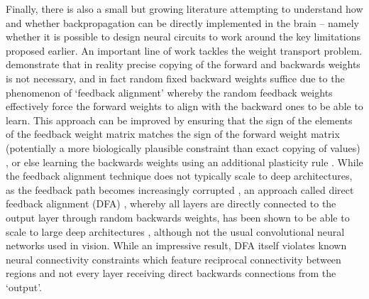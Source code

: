 Finally, there is also a small but growing literature attempting to understand how and whether backpropagation can be directly implemented in the brain -- namely whether it is possible to design neural circuits to work around the key limitations proposed earlier. An important line of work tackles the weight transport problem. \citet{lillicrap2016random} demonstrate that in reality precise copying of the forward and backwards weights is not necessary, and in fact random fixed backward weights suffice due to the phenomenon of `feedback alignment' whereby the random feedback weights effectively force the forward weights to align with the backward ones to be able to learn. This approach can be improved by ensuring that the sign of the elements of the feedback weight matrix matches the sign of the forward weight matrix (potentially a more biologically plausible constraint than exact copying of values) \citep{liao2016important}, or else learning the backwards weights using an additional plasticity rule \citep{amit2019deep,akrout2019deep,millidge2020relaxing}. While the feedback alignment technique does not typically scale to deep architectures, as the feedback path becomes increasingly corrupted \citep{bartunov2018assessing}, an approach called direct feedback alignment (DFA) \citep{nokland2016direct}, whereby all layers are directly connected to the output layer through random backwards weights, has been shown to be able to scale to large deep architectures \citep{launay2019principled}, although not the usual convolutional neural networks used in vision. While an impressive result, DFA itself violates known neural connectivity constraints which feature reciprocal connectivity between regions and not every layer receiving direct backwards connections from the `output'. 

